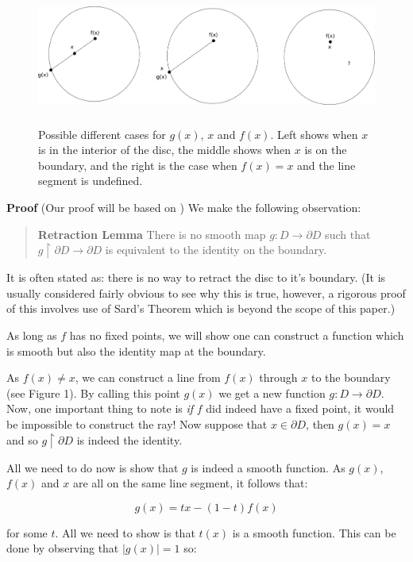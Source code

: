 \documentclass[a4paper]{article}
\begin{document}
\begin{figure}
\includegraphics[height=4.5cm]{fixedpoint}
\centering
\caption{Possible different cases for $g(x)$, $x$ and $f(x)$. Left shows when $x$ is in the interior of the disc, the middle shows when $x$ is on the boundary, and the right is the case when $f(x) = x$ and the line segment is undefined.}
\end{figure}

\textbf{Proof} (Our proof will be based on \cite{guil}) We make the following observation: 

\begin{quote}
    \textbf{Retraction Lemma} There is no smooth map $g : D \to \partial D$ such that $g \upharpoonright \partial D \to \partial D$ is equivalent to the identity on the boundary.
\end{quote}

It is often stated as: there is no way to retract the disc to it's boundary. (It is usually considered fairly obvious to see why this is true, however, a rigorous proof of this involves use of Sard's Theorem which is beyond the scope of this paper.)

As long as $f$ has no fixed points, we will show one can construct a function which is smooth but also the identity map at the boundary.

As $f(x) \neq x$, we can construct a line from $f(x)$ through $x$ to the boundary (see Figure 1). By calling this point $g(x)$ we get a new function $g : D \to \partial D$. Now, one important thing to note is \textit{if} $f$ did indeed have a fixed point, it would be impossible to construct the ray! Now suppose that $x \in \partial D$, then $g(x) = x$ and so $g \upharpoonright \partial D$ is indeed the identity.

All we need to do now is show that $g$ is indeed a smooth function. As $g(x)$, $f(x)$ and $x$ are all on the same line segment, it follows that:

$$g(x) = tx - (1 - t)f(x)$$

for some $t$. All we need to show is that $t(x)$ is a smooth function. This can be done by observing that $|g(x)| = 1$ so:
\end{document}

